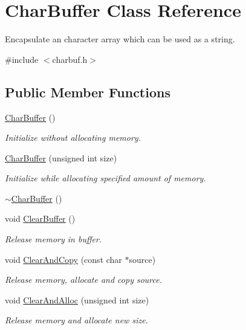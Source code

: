 \hypertarget{classCharBuffer}{}\section{Char\+Buffer Class Reference}
\label{classCharBuffer}


Encapsulate an character array which can be used as a string.  




{\ttfamily \#include $<$charbuf.\+h$>$}

\subsection*{Public Member Functions}
\begin{DoxyCompactItemize}
\item 
\hyperlink{classCharBuffer_a4345e9a5114f5c0292e8f242f26e3a7b}{Char\+Buffer} ()
\begin{DoxyCompactList}\small\item\em Initialize without allocating memory. \end{DoxyCompactList}\item 
\hyperlink{classCharBuffer_a36d153c126a018c5090374ccb5c37508}{Char\+Buffer} (unsigned int size)
\begin{DoxyCompactList}\small\item\em Initialize while allocating specified amount of memory. \end{DoxyCompactList}\item 
\hyperlink{classCharBuffer_a9e62778016bba5191fa9eaa6ea118926}{$\sim$\+Char\+Buffer} ()
\item 
void \hyperlink{classCharBuffer_a0bcdd5708db4b04c887224e83a05086f}{Clear\+Buffer} ()
\begin{DoxyCompactList}\small\item\em Release memory in buffer. \end{DoxyCompactList}\item 
void \hyperlink{classCharBuffer_ac52ed7b91190240eb7db4cf43d1e2abb}{Clear\+And\+Copy} (const char $\ast$source)
\begin{DoxyCompactList}\small\item\em Release memory, allocate and copy source. \end{DoxyCompactList}\item 
void \hyperlink{classCharBuffer_a8c0927c2c05c954161151045f68581c6}{Clear\+And\+Alloc} (unsigned int size)
\begin{DoxyCompactList}\small\item\em Release memory and allocate new size. \end{DoxyCompactList}\item 

\end{DoxyCompactItemize}
